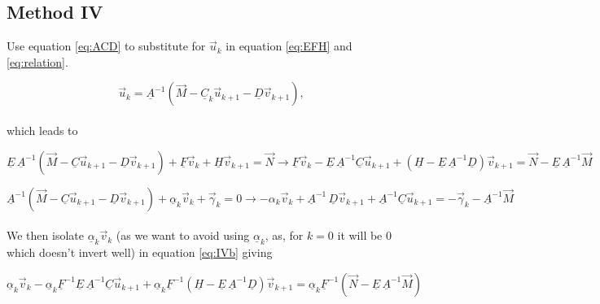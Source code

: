 \documentclass[11pt]{amsart}
\begin{document}
\subsection{Method IV}

Use equation \ref{eq:ACD} to substitute for $\vec{u}_{k}$ in equation \ref{eq:EFH} and \ref{eq:relation}.

\begin{equation} \label{eq:IVa}
\vec{u}_{k}  = \underline{A}^{-1}  \left( \vec{M} - \underline{C}_{k}  \vec{u}_{k+1}  - \underline{D} \vec{v}_{k+1} \right),
\end{equation}
\\
which leads to

\begin{equation} \label{eq:IVb}
\underline{E} \, \underline{A}^{-1} \left(  \vec{M} - \underline{C} \vec{u}_{k+1} - \underline{D} \vec{v}_{k+1}  \right)  +  \underline{F} \vec{v}_{k}  +  \underline{H} \vec{v}_{k+1}  =  \vec{N}   \longrightarrow    \underline{F} \vec{v}_{k}  -  \underline{E} \, \underline{A}^{-1} \underline{C} \vec{u}_{k+1}  +  \left( \underline{H} - \underline{E} \, \underline{A}^{-1} \underline{D} \right) \vec{v}_{k+1}  =  \vec{N}  -  \underline{E} \, \underline{A}^{-1} \vec{M}
\end{equation}

\begin{equation} \label{eq:IVc}
\underline{A}^{-1} \left(  \vec{M} - \underline{C} \vec{u}_{k+1} - \underline{D} \vec{v}_{k+1}  \right)  +  \underline{\alpha}_{k} \vec{v}_{k}  +  \vec{\gamma}_{k}  =  0     \longrightarrow      - \alpha_{k} \vec{v}_{k}  +  \underline{A}^{-1} \, \underline{D} \vec{v}_{k+1}  +  \underline{A}^{-1} \underline{C} \vec{u}_{k+1}  =  - \vec{\gamma}_{k}  - \underline{A}^{-1} \vec{M}
\end{equation} 
\\

We then isolate $\underline{\alpha}_{k} \vec{v}_{k}$ (as we want to avoid using $\underline{\alpha}_{k}$, as, for $k=0$ it will be 0 which doesn't invert well) in equation \ref{eq:IVb} giving


\begin{equation} \label{eq:IVd}
\underline{\alpha}_{k}  \vec{v}_{k}  -  \underline{\alpha}_{k} \underline{F}^{-1} \underline{E} \, \underline{A}^{-1} \underline{C} \vec{u}_{k+1}  +  \underline{\alpha}_{k} \underline{F}^{-1} \left( \underline{H} - \underline{E} \, \underline{A}^{-1} \underline{D} \right) \vec{v}_{k+1}  =  \underline{\alpha}_{k} \underline{F}^{-1}  \left(\vec{N}  -  \underline{E} \, \underline{A}^{-1} \vec{M}  \right)
\end{equation}
\end{document}
